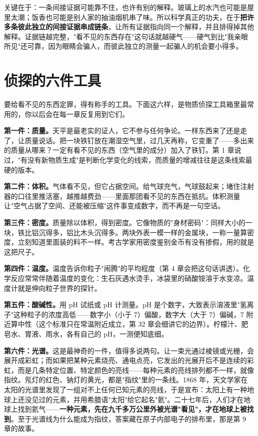 关键在于：一条间接证据可能靠不住，也许有别的解释。玻璃上的水汽也可能是屋里太潮；饭香也可能是别人家的抽油烟机串了味。所以科学真正的功夫，在于\textbf{把许多条彼此独立的间接证据串成链条}，让所有证据指向同一个解释，并且排得掉其他解释。证据链越完整，"看不见的东西存在"这句话就越硬气——硬气到比"我亲眼所见"还可靠，因为眼睛会骗人，而彼此独立的测量一起骗人的机会要小得多。

\section{侦探的六件工具}

要给看不见的东西定罪，得有称手的工具。下面这六样，是物质侦探工具箱里最常用的，你以后会在每一章反复用到它们。

\textbf{第一件：质量。}天平是最老实的证人，它不参与任何争论。一样东西来了还是走了，让质量说话。把一块铁钉放在潮湿空气里，过几天再称，它变重了——多出来的质量从哪来？一定有看不见的东西（空气里的成分）加入了铁钉。第 1 章说过，"有没有新物质生成"是判断化学变化的线索，而质量的增减往往是这条线索最硬的版本。

\textbf{第二件：体积。}气体看不见，但它占据空间。给气球充气，气球鼓起来；堵住注射器的口往里推活塞，越推越费劲——里面那团看不见的东西在抵抗。体积测量让"空气占据了空间、还能被压缩"这件事变成数字，而不再是一句空话。

\textbf{第三件：密度。}质量除以体积，得到密度。它像物质的"身材密码"：同样大小的一块，铁比铝沉得多，铝比木头沉得多。两块外表一模一样的金属块，一称一量算密度，立刻知道里面装的料不一样。考古学家用密度鉴别金币有没有掺假，用的就是这把尺子。

\textbf{第四件：温度。}温度告诉你粒子"闹腾"的平均程度（第 4 章会把这句话讲透）。化学反应常常伴随着温度的变化：生石灰遇水烫手，冰袋里的硝酸铵溶于水变凉。温度计就是伸向粒子世界的探针。

\textbf{第五件：酸碱性。}用 pH 试纸或 pH 计测量。pH 是个数字，大致表示溶液里"氢离子"这种粒子的浓度高低——数字小（小于 7）偏酸，数字大（大于 7）偏碱，7 附近算中性（这个标准只在常温附近成立，第 32 章会细讲它的边界）。柠檬汁、肥皂水、胃液、雨水，各有自己的 pH，一测便知底细。

\textbf{第六件：光谱。}这是最神奇的一件，值得多说两句。让一束光通过棱镜或光栅，会展开成彩虹；而如果把某种元素烧亮、通电点亮，它发出的光展开后不是连续的彩虹，而是几条特定位置、特定颜色的亮线——每种元素的亮线排列都不一样，就像指纹。氖灯的红色、钠灯的黄光，都是"指纹"里的一条线。1868 年，天文学家在太阳的光谱里发现了一组对不上任何已知元素的亮线，于是宣布：太阳上有一种地球上还没见过的元素，并用希腊语"太阳"给它起名"氦"。二十七年后，人们才在地球上找到氦气——\textbf{一种元素，先在九千多万公里外被光谱"看见"，才在地球上被找到}。至于光谱线为什么能成为指纹，答案藏在原子内部电子的排布里，那是第 9 章的故事。

